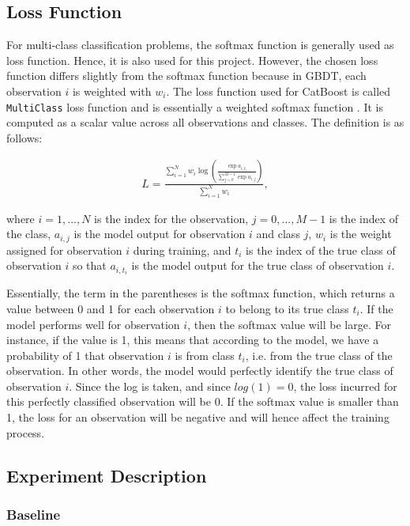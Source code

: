 \documentclass{article}
\begin{document}
	\subsection{Loss Function}
	
	For multi-class classification problems, the softmax function is generally used as loss function. Hence, it is also used for this project. However, the chosen loss function differs slightly from the softmax function because in GBDT, each observation $i$ is weighted with $w_i$. The loss function used for CatBoost is called \lstinline{MultiClass} loss function and is essentially a weighted softmax function \cite{noauthor_multiclassification:_nodate}. It is computed as a scalar value across all observations and classes. The definition is as follows:
	
	\begin{align}
	L = \frac{\sum_{i = 1}^N w_i \log \left(\frac{\exp a_{i, t_i}}{\sum_{j = 0}^{M-1} \exp a_{i, j}}\right)}{\sum_{i = 1}^N w_i}, 
	\end{align}
	
	where $i = 1, ..., N$ is the index for the observation, $j = 0, ..., M-1$ is the index of the class, $a_{i, j}$ is the model output for observation $i$ and class $j$, $w_i$ is the weight assigned for observation $i$ during training, and $t_i$ is the index of the true class of observation $i$ so that $a_{i, t_i}$ is the model output for the true class of observation $i$.
	
	Essentially, the term in the parentheses is the softmax function, which returns a value between 0 and 1 for each observation $i$ to belong to its true class $t_i$. If the model performs well for observation $i$, then the softmax value will be large. For instance, if the value is 1, this means that according to the model, we have a probability of 1 that observation $i$ is from class $t_i$, i.e. from the true class of the observation. In other words, the model would perfectly identify the true class of observation $i$. Since the log is taken, and since $log(1)=0$, the loss incurred for this perfectly classified observation will be 0. If the softmax value is smaller than 1, the loss for an observation will be negative and will hence affect the training process.
	
	\subsection{Experiment Description}
	
	\subsubsection{Baseline}
	
\end{document}
